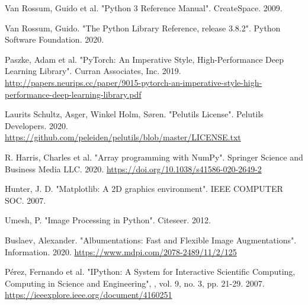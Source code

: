 \documentclass[12pt, fleqn, titlepage]{article}
\begin{document}
\newpage
\begin{thebibliography}{9} 
	
	
	
		
		 Van Rossum, Guido et al. "Python 3 Reference Manual". CreateSpace. 2009.
		
		 Van Rossum, Guido. "The Python Library Reference, release 3.8.2". Python Software Foundation. 2020.
		
		 Paszke, Adam et al. "PyTorch: An Imperative Style, High-Performance Deep Learning Library". Curran Associates, Inc. 2019. \url{http://papers.neurips.cc/paper/9015-pytorch-an-imperative-style-high-performance-deep-learning-library.pdf}
		
		 Laurits Schultz, Asger, Winkel Holm, Søren. "Pelutils License". Pelutils Developers. 2020. \url{https://github.com/peleiden/pelutils/blob/master/LICENSE.txt}
		
		 R. Harris, Charles et al. "Array programming with NumPy". Springer Science and Business Media LLC. 2020. \url{https://doi.org/10.1038/s41586-020-2649-2}
		
		 Hunter, J. D. "Matplotlib: A 2D graphics environment". IEEE COMPUTER SOC. 2007.
		
		 Umesh, P. "Image Processing in Python". Citeseer. 2012.
		
		 Buslaev, Alexander. "Albumentations: Fast and Flexible Image Augmentations". Information. 2020. \url{https://www.mdpi.com/2078-2489/11/2/125}
		
		 Pérez, Fernando et al. "IPython: A System for Interactive Scientific Computing, Computing in Science and Engineering", , vol. 9, no. 3, pp. 21-29. 2007. \url{https://ieeexplore.ieee.org/document/4160251}
		

\end{thebibliography}
\end{document}
